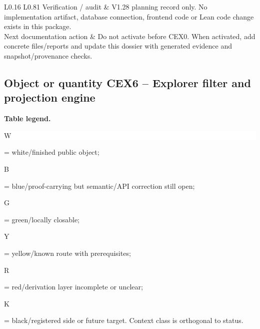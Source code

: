 \begin{longtable}{L{0.16\linewidth} L{0.81\linewidth}}
\hline\addlinespace[0.20em]
Verification /\allowbreak{} audit & V1.28 planning record only. No implementation artifact, database connection, frontend code or Lean code change exists in this package.\\
\hline\addlinespace[0.20em]
Next documentation action & Do not activate before CEX0. When activated, add concrete files/\allowbreak{}reports and update this dossier with generated evidence and snapshot/\allowbreak{}provenance checks.\\
\hline\addlinespace[0.20em]
\end{longtable}
\subsection*{Object or quantity CEX6 -- Explorer filter and projection engine}
\hypertarget{objproof:CEX6}{}
\par\smallskip\noindent\begin{minipage}{0.99\linewidth}\footnotesize\raggedright\textbf{Table legend.} \colorbox{white}{\strut W} = white/finished public object; \colorbox{cyan!20}{\strut B} = blue/proof-carrying but semantic/API correction still open; \colorbox{green!18}{\strut G} = green/locally closable; \colorbox{yellow!25}{\strut Y} = yellow/known route with prerequisites; \colorbox{red!20}{\strut R} = red/derivation layer incomplete or unclear; \colorbox{black!18}{\strut K} = black/registered side or future target. Context class is orthogonal to status.\end{minipage}\par\vspace{0.25em}
